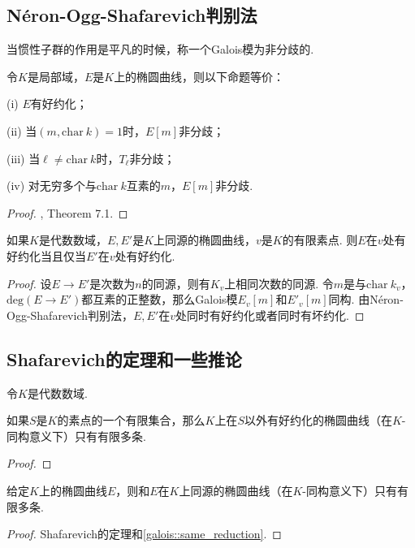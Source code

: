 \subsection{Néron-Ogg-Shafarevich判别法}

当惯性子群的作用是平凡的时候，称一个Galois模为非分歧的.

\begin{cthm}
    令$K$是局部域，$E$是$K$上的椭圆曲线，则以下命题等价：

    (i) $E$有好约化；

    (ii) 当$(m, \mathrm{char}\ k)=1$时，$E[m]$非分歧；

    (iii) 当$\ell\neq \mathrm{char}\ k$时，$T_{\ell}$非分歧；

    (iv) 对无穷多个与$\mathrm{char}\ k$互素的$m$，$E[m]$非分歧.
\end{cthm}

\begin{proof}
    \cite{silverman2009arithmetic}, Theorem 7.1.
\end{proof}

\begin{ccor}
    如果$K$是代数数域，$E, E'$是$K$上同源的椭圆曲线，$v$是$K$的有限素点. 则$E$在$v$处有好约化当且仅当$E'$在$v$处有好约化. \label{galois::same_reduction}
\end{ccor}

\begin{proof}
    设$E\to E'$是次数为$n$的同源，则有$K_v$上相同次数的同源. 令$m$是与$\mathrm{char}\ k_v$，$\mathrm{deg}(E\to E')$都互素的正整数，那么Galois模$E_v[m]$和$E'_v[m]$同构. 由Néron-Ogg-Shafarevich判别法，$E, E'$在$v$处同时有好约化或者同时有坏约化.
\end{proof}


\subsection{Shafarevich的定理和一些推论}

令$K$是代数数域.

\begin{cthm}[Shafarevich]
    如果$S$是$K$的素点的一个有限集合，那么$K$上在$S$以外有好约化的椭圆曲线（在$K$-同构意义下）只有有限多条.
\end{cthm}

\begin{proof}
\end{proof}

\begin{ccor}
    给定$K$上的椭圆曲线$E$，则和$E$在$K$上同源的椭圆曲线（在$K$-同构意义下）只有有限多条.\label{galois::isogeny_finite_curves}
\end{ccor}

\begin{proof}
    Shafarevich的定理和\ref{galois::same_reduction}.
\end{proof}
